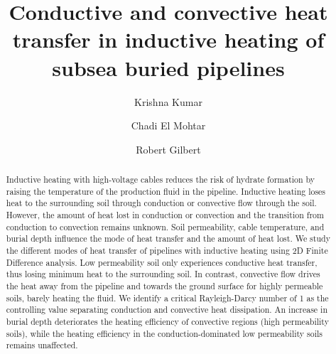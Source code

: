 \documentclass[Journal,letterpaper,InsideFigs]{ascelike-new}
\begin{document}
\title{Conductive and convective heat transfer in inductive heating of subsea buried pipelines}

\author[1]{Krishna Kumar}
\author[2]{Chadi El Mohtar}
\author[2]{Robert Gilbert}


\maketitle

\begin{abstract}
Inductive heating with high-voltage cables reduces the risk of hydrate formation by raising the temperature of the production fluid in the pipeline. Inductive heating loses heat to the surrounding soil through conduction or convective flow through the soil. However, the amount of heat lost in conduction or convection and the transition from conduction to convection remains unknown. Soil permeability, cable temperature, and burial depth influence the mode of heat transfer and the amount of heat lost. We study the different modes of heat transfer of pipelines with inductive heating using 2D Finite Difference analysis. Low permeability soil only experiences conductive heat transfer, thus losing minimum heat to the surrounding soil. In contrast, convective flow drives the heat away from the pipeline and towards the ground surface for highly permeable soils, barely heating the fluid.  We identify a critical Rayleigh-Darcy number of 1 as the controlling value separating conduction and convective heat dissipation. An increase in burial depth deteriorates the heating efficiency of convective regions (high permeability soils), while the heating efficiency in the conduction-dominated low permeability soils remains unaffected.
\end{abstract}
\end{document}
